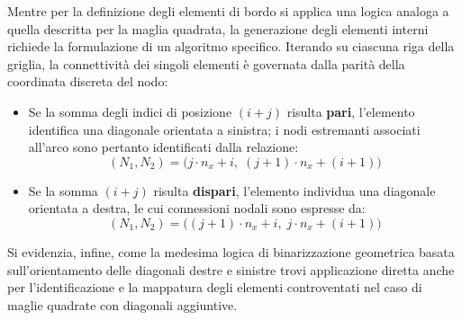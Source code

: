 Mentre per la definizione degli elementi di bordo si applica una logica analoga a quella descritta per la maglia quadrata, la generazione degli elementi interni richiede la formulazione di un algoritmo specifico. Iterando su ciascuna riga della griglia, la connettività dei singoli elementi è governata dalla parità della coordinata discreta del nodo:
\begin{itemize}
    \item Se la somma degli indici di posizione $(i + j)$ risulta \textbf{pari}, l'elemento identifica una diagonale orientata a sinistra; i nodi estremanti associati all'arco sono pertanto identificati dalla relazione:
    \begin{equation}
        (N_1, N_2) = \bigl(j \cdot n_x + i, \; (j + 1) \cdot n_x + (i + 1)\bigr)
    \end{equation}
    \item Se la somma $(i + j)$ risulta \textbf{dispari}, l'elemento individua una diagonale orientata a destra, le cui connessioni nodali sono espresse da:
    \begin{equation}
        (N_1, N_2) = \bigl((j + 1) \cdot n_x + i, \; j \cdot n_x + (i + 1)\bigr)
    \end{equation}
\end{itemize}
Si evidenzia, infine, come la medesima logica di binarizzazione geometrica basata sull'orientamento delle diagonali destre e sinistre trovi applicazione diretta anche per l'identificazione e la mappatura degli elementi controventati nel caso di maglie quadrate con diagonali aggiuntive.

